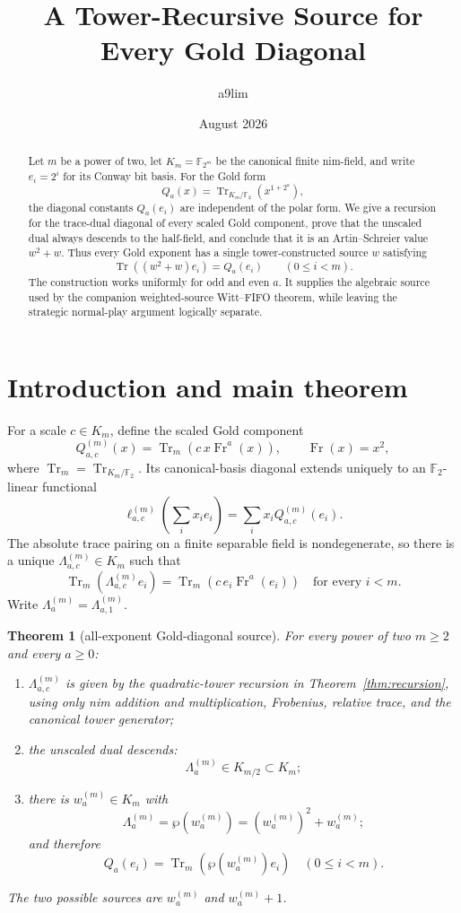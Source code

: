 \documentclass[11pt]{article}
\title{A Tower-Recursive Source for Every Gold Diagonal}
\author{a9lim}
\date{August 2026}
\newtheorem{theorem}{Theorem}[section]
\theoremstyle{remark}
\newcommand{\F}{\mathbb F}
\newcommand{\Tr}{\operatorname{Tr}}
\newcommand{\Fr}{\operatorname{Fr}}
\newcommand{\AS}{\wp}
\newcommand{\Lam}{\Lambda}
\begin{document}
\maketitle

\begin{abstract}
Let $m$ be a power of two, let $K_m=\F_{2^m}$ be the canonical finite
nim-field, and write $e_i=2^i$ for its Conway bit basis.  For the Gold form
\[
 Q_a(x)=\Tr_{K_m/\F_2}\!\left(x^{1+2^a}\right),
\]
the diagonal constants $Q_a(e_i)$ are independent of the polar form. We give
a recursion for the trace-dual diagonal of every scaled Gold component,
prove that the unscaled dual always descends to the half-field, and conclude
that it is an Artin--Schreier value $w^2+w$.  Thus every Gold exponent has a
single tower-constructed source $w$ satisfying
\[
 \Tr\!\left((w^2+w)e_i\right)=Q_a(e_i)\qquad(0\le i<m).
\]
The construction works uniformly for odd and even $a$. It supplies the
algebraic source used by the companion weighted-source Witt--FIFO theorem,
while leaving the strategic normal-play argument logically separate.
\end{abstract}

\section{Introduction and main theorem}

For a scale $c\in K_m$, define the scaled Gold component
\[
 Q^{(m)}_{a,c}(x)=\Tr_m\!\left(c\,x\Fr^a(x)\right),
 \qquad \Fr(x)=x^2,
\]
where $\Tr_m=\Tr_{K_m/\F_2}$.  Its canonical-basis diagonal extends uniquely
to an $\F_2$-linear functional
\[
 \ell^{(m)}_{a,c}\!\left(\sum_i x_i e_i\right)
   =\sum_i x_i Q^{(m)}_{a,c}(e_i).
\]
The absolute trace pairing on a finite separable field is nondegenerate, so
there is a unique $\Lam^{(m)}_{a,c}\in K_m$ such that
\begin{equation}\label{eq:dual}
 \Tr_m\!\left(\Lam^{(m)}_{a,c}e_i\right)
 =\Tr_m\!\left(c\,e_i\Fr^a(e_i)\right)
 \quad\text{for every }i<m.
\end{equation}
Write $\Lam^{(m)}_a=\Lam^{(m)}_{a,1}$.

\begin{theorem}[all-exponent Gold-diagonal source]\label{thm:main}
For every power of two $m\ge2$ and every $a\ge0$:
\begin{enumerate}
\item $\Lam^{(m)}_{a,c}$ is given by the quadratic-tower recursion in
Theorem~\ref{thm:recursion}, using only nim addition and multiplication,
Frobenius, relative trace, and the canonical tower generator;
\item the unscaled dual descends:
\[
 \Lam^{(m)}_a\in K_{m/2}\subset K_m;
\]
\item there is $w^{(m)}_a\in K_m$ with
\[
 \Lam^{(m)}_a=\AS(w^{(m)}_a)
   =(w^{(m)}_a)^2+w^{(m)}_a;
\]
and therefore
\[
 Q_a(e_i)=\Tr_m\!\left(\AS(w^{(m)}_a)e_i\right)
 \quad(0\le i<m).
\]
\end{enumerate}
The two possible sources are $w^{(m)}_a$ and $w^{(m)}_a+1$.
\end{theorem}
\end{document}
